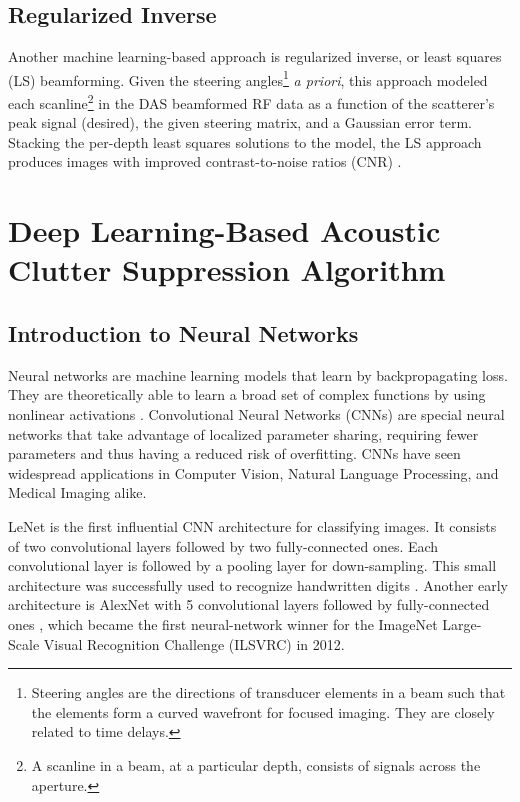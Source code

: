     \subsection{Regularized Inverse}
      Another machine learning-based approach is regularized inverse, or least squares (LS) beamforming. Given the steering angles\footnote{Steering angles are the directions of transducer elements in a beam such that the elements form a curved wavefront for focused imaging. They are closely related to time delays.} \textit{a priori}, this approach modeled each scanline\footnote{A scanline in a beam, at a particular depth, consists of signals across the aperture.} in the DAS beamformed RF data as a function of the scatterer's peak signal (desired), the given steering matrix, and a Gaussian error term. Stacking the per-depth least squares solutions to the model, the LS approach produces images with improved contrast-to-noise ratios (CNR) \cite{szasz_regularized_inverse}. %

  \section{Deep Learning-Based Acoustic Clutter Suppression Algorithm} %
    \subsection{Introduction to Neural Networks}
      Neural networks are machine learning models that learn by backpropagating loss. They are theoretically able to learn a broad set of complex functions by using nonlinear activations \cite{rumelhart1985learning}. Convolutional Neural Networks (CNNs) are special neural networks that take advantage of localized parameter sharing, requiring fewer parameters and thus having a reduced risk of overfitting. CNNs have seen widespread applications in Computer Vision, Natural Language Processing, and Medical Imaging alike.

      LeNet is the first influential CNN architecture for classifying images. It consists of two convolutional layers followed by two fully-connected ones. Each convolutional layer is followed by a pooling layer for down-sampling. This small architecture was successfully used to recognize handwritten digits \cite{lenet}. Another early architecture is AlexNet with 5 convolutional layers followed by fully-connected ones \cite{krizhevsky2012imagenet}, which became the first neural-network winner for the ImageNet Large-Scale Visual Recognition Challenge (ILSVRC) in 2012.

